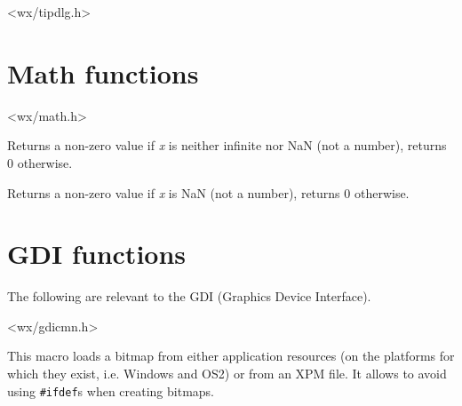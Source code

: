 




<wx/tipdlg.h>




\section{Math functions}\label{mathfunctions}


<wx/math.h>


\label{wxfinite}


Returns a non-zero value if {\it x} is neither infinite nor NaN (not a number),
returns 0 otherwise.


\label{wxisnan}


Returns a non-zero value if {\it x} is NaN (not a number), returns 0
otherwise.




\section{GDI functions}\label{gdifunctions}

The following are relevant to the GDI (Graphics Device Interface).


<wx/gdicmn.h>


\label{wxbitmapmacro}


This macro loads a bitmap from either application resources (on the platforms
for which they exist, i.e. Windows and OS2) or from an XPM file. It allows to
avoid using {\tt \#ifdef}s when creating bitmaps.

